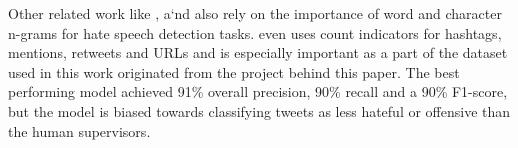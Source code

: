 Other related work like \cite{Gaydhani2018}, \cite{Malmasi2017} a`nd \cite{ThomasDavidson2020} also rely on the importance of word and character n-grams for hate speech detection tasks. \cite{ThomasDavidson2020} even uses count indicators for hashtags, mentions, retweets and URLs and is especially important as a part of the dataset used in this work originated from the project behind this paper. The best performing model achieved 91\% overall precision, 90\% recall and a 90\% F1-score, but the model is biased towards classifying tweets as less hateful or offensive than the human supervisors. 
